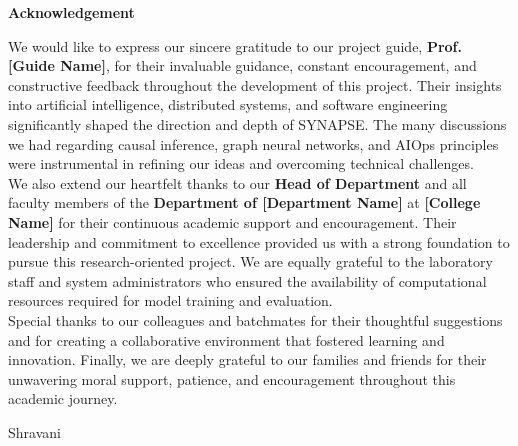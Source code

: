 \begin{center}
\bfseries \fontsize{24}{12} \selectfont Acknowledgement
\end{center}
\vspace*{1\baselineskip}
\hspace*{0.5in}We would like to express our sincere gratitude to our project guide, \textbf{Prof. [Guide Name]}, for their invaluable guidance, constant encouragement, and constructive feedback throughout the development of this project. Their insights into artificial intelligence, distributed systems, and software engineering significantly shaped the direction and depth of SYNAPSE. The many discussions we had regarding causal inference, graph neural networks, and AIOps principles were instrumental in refining our ideas and overcoming technical challenges.\\

\hspace*{0.5in}We also extend our heartfelt thanks to our \textbf{Head of Department} and all faculty members of the \textbf{Department of [Department Name]} at \textbf{[College Name]} for their continuous academic support and encouragement. Their leadership and commitment to excellence provided us with a strong foundation to pursue this research-oriented project. We are equally grateful to the laboratory staff and system administrators who ensured the availability of computational resources required for model training and evaluation.\\

\hspace*{0.5in}Special thanks to our colleagues and batchmates for their thoughtful suggestions and for creating a collaborative environment that fostered learning and innovation. Finally, we are deeply grateful to our families and friends for their unwavering moral support, patience, and encouragement throughout this academic journey.\\

\vspace*{3\baselineskip}
\begin{flushright}
Shravani \\
[Teammate 2] \\
[Teammate 3] \\
[Teammate 4]
\end{flushright}
